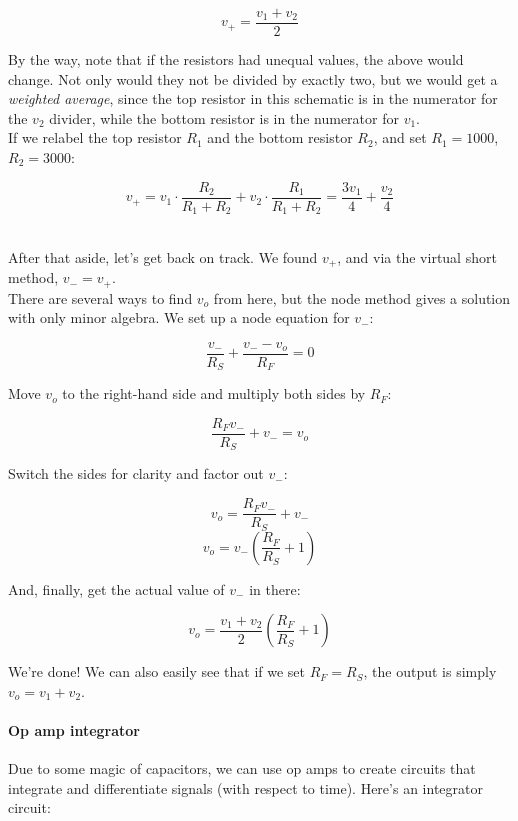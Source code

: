\[ v_+ = \frac{v_1 + v_2}{2} \]

By the way, note that if the resistors had unequal values, the above would change. Not only would they not be divided by exactly two, but we would get a \emph{weighted average}, since the top resistor in this schematic is in the numerator for the $v_2$ divider, while the bottom resistor is in the numerator for $v_1$.\\
If we relabel the top resistor $R_1$ and the bottom resistor $R_2$, and set $R_1 = 1000$, $R_2 = 3000$:

\[ v_+ = v_1 \cdot \frac{R_2}{R_1 + R_2} + v_2 \cdot \frac{R_1}{R_1 + R_2} = \frac{3 v_1}{4} + \frac{v_2}{4} \]

\ \\
After that aside, let's get back on track. We found $v_+$, and via the virtual short method, $v_- = v_+$.\\

There are several ways to find $v_o$ from here, but the node method gives a solution with only minor algebra. We set up a node equation for $v_-$:

\[ \frac{v_-}{R_S} + \frac{v_- - v_o}{R_F} = 0 \]

Move $v_o$ to the right-hand side and multiply both sides by $R_F$:

\[ \frac{R_F v_-}{R_S} + v_- = v_o \]

Switch the sides for clarity and factor out $v_-$:

\[ v_o = \frac{R_F v_-}{R_S} + v_- \]
\[ v_o = v_-(\frac{R_F}{R_S} + 1) \]

And, finally, get the actual value of $v_-$ in there:

\[ v_o = \frac{v_1 + v_2}{2} (\frac{R_F}{R_S} + 1) \]

We're done! We can also easily see that if we set $R_F = R_S$, the output is simply $v_o = v_1 + v_2$.


\paragraph{Op amp integrator}
Due to some magic of capacitors, we can use op amps to create circuits that integrate and differentiate signals (with respect to time). Here's an integrator circuit:

